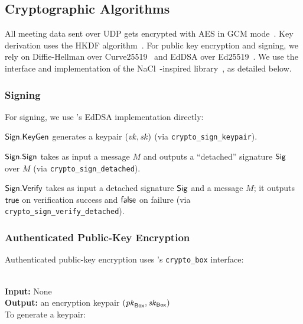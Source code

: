 \subsection{Cryptographic Algorithms}

All meeting data sent over UDP gets encrypted with AES in GCM mode~\cite{sp80038d}.
%
Key derivation uses the HKDF algorithm~\cite{rfc5869}.
%
For public key encryption and signing, we rely on Diffie-Hellman over Curve25519~\cite{bernstein2006curve25519} and EdDSA over Ed25519~\cite{eddsa}.
%
We use the interface and implementation of the NaCl~\cite{nacl}-inspired \sodium{} library~\cite{libsodium}, as detailed below.

\subsubsection{Signing}

For signing, we use \sodium 's EdDSA implementation directly:
%
\begin{itemize*}
   \item ${\sf Sign}.\mathsf{KeyGen}$ generates a keypair $(\mathit{vk}, \mathit{sk})$ (via \texttt{crypto\_sign\_keypair}).
   \item ${\sf Sign}.\mathsf{Sign}$ takes as input a message $M$ and outputs a ``detached'' signature
   ${\sf Sig}$ over $M$ (via \texttt{crypto\_sign\_detached}).
   \item ${\sf Sign}.\mathsf{Verify}$ takes as input a detached signature ${\sf Sig}$ and a message $M$; it outputs $\mathsf{true}$ on verification success
   and $\mathsf{false}$ on failure (via \texttt{crypto\_sign\_verify\_detached}).
\end{itemize*}

\subsubsection{Authenticated Public-Key Encryption}

Authenticated public-key encryption uses \sodium 's \texttt{crypto\_box}
interface:


{\underline {\bf \cboxkeygen}}\\
{\bf Input:} None \\
{\bf Output:} an encryption keypair $(\mathit{pk}_{{\sf Box}}, \mathit{sk}_{{\sf Box}})$ \\

\vspace{-1.5em}
To generate a keypair:

